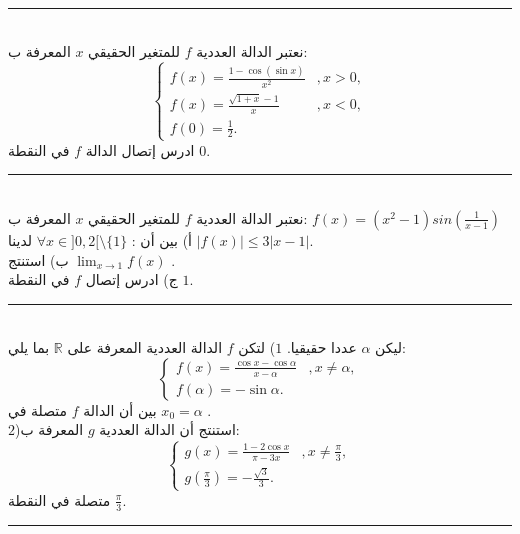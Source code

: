 \documentclass[10pt,a4paper,twocolumn]{arabart}
\begin{document}
\\
 \hrule
 \\
           نعتبر الدالة العددية $f$ للمتغير الحقيقي $x$ المعرفة ب:\\
       \begin{displaymath}
 \left\{
    \begin{array}{ll}
       f(x)=\displaystyle\frac{1-\cos{(\sin{ x})} }{x^2}    &,  x >0,\\
        f(x)=\displaystyle\frac{\sqrt{1+x}-1}{x}    &,  x <0,\\
      f(0)=\frac{1}{2}.   &
    \end{array}
\right.
\end{displaymath}
ادرس إتصال الدالة $f$ في النقطة $0$.
\\
 \hrule
 \\
           نعتبر الدالة العددية $f$ للمتغير الحقيقي $x$ المعرفة ب:
           $f(x)=(x^2-1)sin(\frac{1}{x-1})$\\
      أ) بين أن : 
       $\forall x\in ]0,2[\setminus\{1\} $ لدينا 
       $|f(x)|\leqslant 3|x-1|$.\\
       ب) استنتج 
       $\displaystyle\lim_{x\rightarrow 1}f(x)$
       .\\
       ج) ادرس إتصال $f$ في النقطة $1$.
\\
 \hrule
 \\
        ليكن $\alpha$  عددا حقيقيا. 
      $ 1 $)  لتكن $f$ الدالة العددية المعرفة على 
        $\mathbb{R}$
        بما يلي:
      \begin{displaymath}
 \left\{
    \begin{array}{ll}
       f(x)=\displaystyle\frac{\cos{ x} - \cos{\alpha}}{x-\alpha}    &,  x \neq \alpha,\\
      f(\alpha)=-\sin{\alpha}.   &
    \end{array}
\right.
\end{displaymath}  
بين أن الدالة $f$ متصلة في
$x_0=\alpha$ 
.\\
 $ 2 $)استنتج أن الدالة العددية $g$  المعرفة ب:\\
  \begin{displaymath}
 \left\{
    \begin{array}{ll}
       g(x)=\displaystyle\frac{1 - 2\cos{x}}{\pi -3x}    &,  x \neq \frac{\pi}{3},\\
      g(\frac{\pi}{3})=-\frac{\sqrt{3}}{3}.   &
    \end{array}
\right.
\end{displaymath} 
متصلة في النقطة $\frac{\pi}{3}$.
\\
 \hrule
\end{document}
